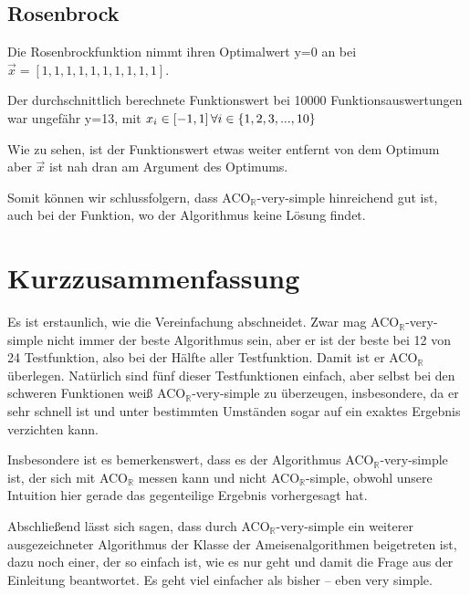 \documentclass[fontsize=12, a4aper]{scrartcl}
\begin{document}
	\subsection{Rosenbrock}
	
	Die Rosenbrockfunktion nimmt ihren Optimalwert y=0 an bei \(\overrightarrow{x} = [1, 1, 1, 1, 1, 1, 1, 1, 1, 1]\).\hfill\newline
	
	\noindent Der durchschnittlich berechnete Funktionswert bei 10000 Funktionsauswertungen war ungefähr y=13, mit \(x_i \in [-1,1] \hspace{.16667em} \forall i \in \{1, 2, 3, ..., 10\}\)\hfill\newline
	
	\noindent Wie zu sehen, ist der Funktionswert etwas weiter entfernt von dem Optimum aber \(\overrightarrow{x}\) ist nah dran am Argument des Optimums.\hfill\newline
	
	Somit können wir schlussfolgern, dass ACO\(_{\mathbb{R}}\)-very-simple hinreichend gut ist, auch bei der Funktion, wo der Algorithmus keine Lösung findet.
	
	
	\section{Kurzzusammenfassung}
	
	Es ist erstaunlich, wie die Vereinfachung abschneidet. Zwar mag ACO\(_{\mathbb{R}}\)-very-simple nicht immer der beste Algorithmus sein, aber er ist der beste bei 12 von 24 Testfunktion, also bei der Hälfte aller Testfunktion. Damit ist er ACO\(_{\mathbb{R}}\) überlegen. Natürlich sind fünf dieser Testfunktionen einfach, aber selbst bei den schweren Funktionen weiß ACO\(_{\mathbb{R}}\)-very-simple zu überzeugen, insbesondere, da er sehr schnell ist und unter bestimmten Umständen sogar auf ein exaktes Ergebnis verzichten kann.\hfill\newline
	
	Insbesondere ist es bemerkenswert, dass es der Algorithmus ACO\(_{\mathbb{R}}\)-very-simple ist, der sich mit ACO\(_{\mathbb{R}}\) messen kann und nicht ACO\(_{\mathbb{R}}\)-simple, obwohl unsere Intuition hier gerade das gegenteilige Ergebnis vorhergesagt hat.\hfill\newline
	
	Abschließend lässt sich sagen, dass durch ACO\(_{\mathbb{R}}\)-very-simple ein weiterer ausgezeichneter Algorithmus der Klasse der Ameisenalgorithmen beigetreten ist, dazu noch einer, der so einfach ist, wie es nur geht und damit die Frage aus der Einleitung beantwortet. Es geht viel einfacher als bisher -- eben very simple.\hfill\newline
	
\end{document}

